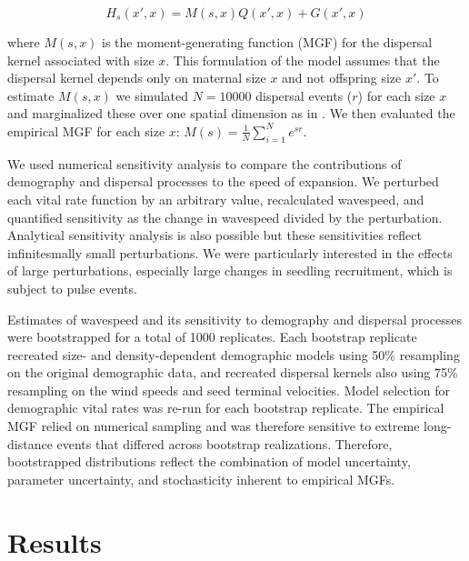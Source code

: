 \documentclass[11pt]{article}\usepackage[]{graphicx}\usepackage[usenames,dvipsnames]{xcolor}
\begin{document}
\begin{linenomath*} 
\begin{equation} 
H_{s}(x\prime,x) = M(s,x)Q(x\prime,x) + G(x\prime,x)
\end{equation} 
\end{linenomath*}

where $M(s,x)$ is the moment-generating function (MGF) for the dispersal kernel associated with size $x$.
This formulation of the model assumes that the dispersal kernel depends only on maternal size $x$ and not offspring size $x\prime$.
To estimate $M(s,x)$ we simulated $N=10000$ dispersal events ($r$) for each size $x$ and marginalized these over one spatial dimension as in \cite{lewis2006guide}.
We then evaluated the empirical MGF for each size $x$: $M(s)=\frac{1}{N} \sum_{i=1}^{N}e^{sr}$. 

We used numerical sensitivity analysis to compare the contributions of demography and dispersal processes to the speed of expansion. 
We perturbed each vital rate function by an arbitrary value, recalculated wavespeed, and quantified sensitivity as the change in wavespeed divided by the perturbation. 
Analytical sensitivity analysis is also possible \citep{ellner2016data} but these sensitivities reflect infinitesmally small perturbations.
We were particularly interested in the effects of large perturbations, especially large changes in seedling recruitment, which is subject to pulse events. 

Estimates of wavespeed and its sensitivity to demography and dispersal processes were bootstrapped for a total of 1000 replicates.
Each bootstrap replicate recreated size- and density-dependent demographic models using 50\% resampling on the original demographic data, and recreated dispersal kernels also using 75\% resampling on the wind speeds and seed terminal velocities.
Model selection for demographic vital rates was re-run for each bootstrap replicate. 
The empirical MGF relied on numerical sampling and was therefore sensitive to extreme long-distance events that differed across bootstrap realizations. 
Therefore, bootstrapped distributions reflect the combination of model uncertainty, parameter uncertainty, and stochasticity inherent to empirical MGFs. 

\section*{Results}
\end{document}
